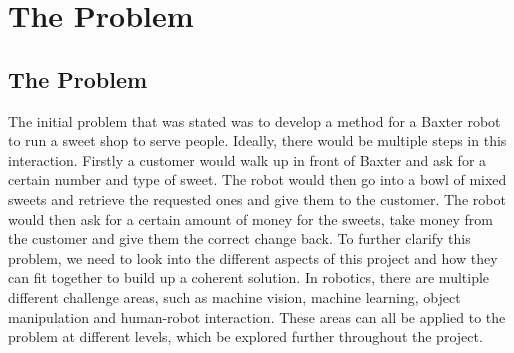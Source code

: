 \chapter{The Problem}
\setcounter{page}{1}
\label{chapter0}
\section{The Problem}
The initial problem that was stated was to develop a method for a Baxter robot to run a sweet shop to serve people. Ideally, there would be multiple steps in this interaction. Firstly a customer would walk up in front of Baxter and ask for a certain number and type of sweet. The robot would then go into a bowl of mixed sweets and retrieve the requested ones and give them to the customer. The robot would then ask for a certain amount of money for the sweets, take money from the customer and give them the correct change back.
To further clarify this problem, we need to look into the different aspects of this project and how they can fit together to build up a coherent solution. In robotics, there are multiple different challenge areas, such as machine vision, machine learning, object manipulation and human-robot interaction. These areas can all be applied to the problem at different levels, which be explored further throughout the project.

